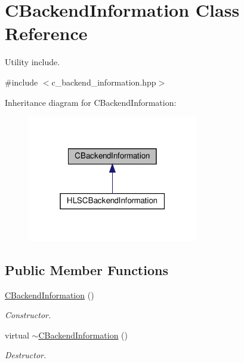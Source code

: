 \hypertarget{classCBackendInformation}{}\section{C\+Backend\+Information Class Reference}
\label{classCBackendInformation}


Utility include.  




{\ttfamily \#include $<$c\+\_\+backend\+\_\+information.\+hpp$>$}



Inheritance diagram for C\+Backend\+Information\+:
\nopagebreak
\begin{figure}[H]
\begin{center}
\leavevmode
\includegraphics[width=211pt]{df/d11/classCBackendInformation__inherit__graph}
\end{center}
\end{figure}
\subsection*{Public Member Functions}
\begin{DoxyCompactItemize}
\item 
\hyperlink{classCBackendInformation_a532a1da62672f9e1e7a23dc9da34a661}{C\+Backend\+Information} ()
\begin{DoxyCompactList}\small\item\em Constructor. \end{DoxyCompactList}\item 
virtual \hyperlink{classCBackendInformation_a6f4f9df9f833ad52da39958096bd8e39}{$\sim$\+C\+Backend\+Information} ()
\begin{DoxyCompactList}\small\item\em Destructor. \end{DoxyCompactList}\end{DoxyCompactItemize}


